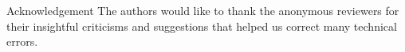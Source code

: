 \documentclass[journal]{IEEEtran}
\begin{document}
\begin{appendix}
\end{appendix}

\begin{section}{Acknowledgement}
	The authors would like to thank the anonymous reviewers for their insightful criticisms and suggestions that helped us correct many technical errors.
\end{section}



\end{document}
